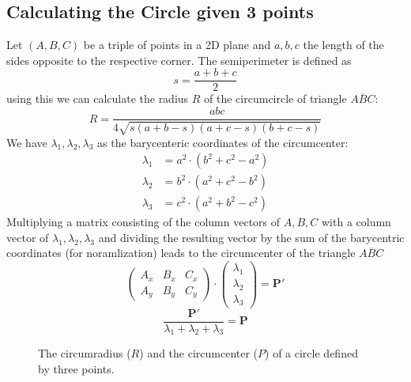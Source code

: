 \documentclass[11pt,twoside]{scrreprt}
\begin{document}

\subsection{Calculating the Circle given 3 points}

Let $(A,B,C)$ be a triple of points in a 2D plane and $a,b,c$ the length of the sides opposite to the respective corner.
%
The semiperimeter is defined as
%
\begin{equation}
  s = \frac{a+b+c}{2}
\end{equation}
%
using this we can calculate the radius $R$ of the circumcircle of triangle $\overline{ABC}$:
\begin{equation}
  R = \frac{abc}{4\sqrt{s(a+b-s)(a+c-s)(b+c-s)}}
\end{equation}
We have $\lambda_1, \lambda_2, \lambda_3$ as the barycenteric coordinates of the circumcenter:
\begin{align}
  \lambda_1 &= a^2\cdot(b^2+c^2-a^2)\\
  \lambda_2 &= b^2\cdot(a^2+c^2-b^2)\\
  \lambda_3 &= c^2\cdot(a^2+b^2-c^2)
\end{align}
Multiplying a matrix consisting of the column vectors of $A,B,C$ with a column vector of $\lambda_1, \lambda_2, \lambda_3$ and dividing the resulting vector by the sum of the barycentric coordinates (for noramlization) leads to the circumcenter of the triangle $\overline{ABC}$ 
%
\begin{equation}
  \begin{pmatrix}
    A_x & B_x & C_x \\
    A_y & B_y & C_y
  \end{pmatrix} \cdot \begin{pmatrix}
    \lambda_1\\
    \lambda_2\\
    \lambda_3
  \end{pmatrix} = \boldsymbol{P'}
\end{equation}
%
\begin{equation}
  \frac{\boldsymbol{P'}}{\lambda_1+\lambda_2+\lambda_3} = \boldsymbol{P}
\end{equation}
%
\begin{figure}[tb]
\centering
{}
\caption{The circumradius ($R$) and the circumcenter ($P$) of a circle defined by three points.}
\label{fig:circum_fig}
\end{figure}
\end{document}
